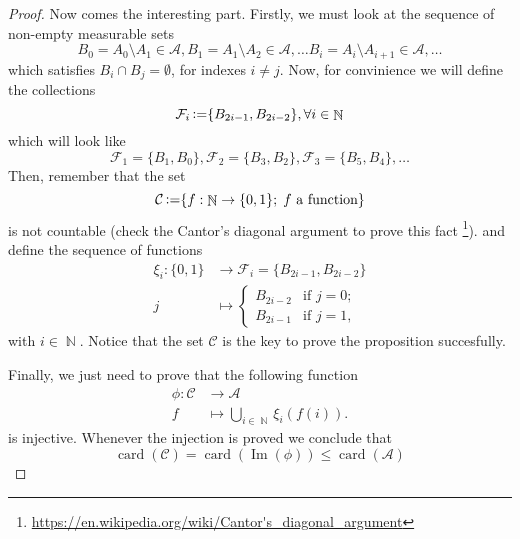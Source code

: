 \documentclass[11pt,twoside,a4paper]{article}
\DeclareMathOperator {\card}{card}
\DeclareMathOperator {\N}{\mathbb{N}}
\DeclareMathOperator{\definedAs}{\vcentcolon = }
\DeclareMathOperator {\Imagem}{ Im }
\theoremstyle{remark}
\theoremstyle{definition}
\theoremstyle{plain}
\begin{document}
\begin{proof}
    Now comes the interesting part. Firstly, we must look at the sequence
    of non-empty measurable sets
    \begin{equation*}
        B_0 = A_0 \setminus A_1 \in \mathcal{A},
        B_1 = A_1 \setminus A_2 \in \mathcal{A},
        \ldots
        B_i = A_i \setminus A_{i+1} \in \mathcal{A},
        \ldots
    \end{equation*}
    which satisfies $B_i \cap B_j  = \emptyset$, for indexes $i \neq j$.
    Now, for convinience we will define the collections
    \begin{equation*}
        \mathcal{F}_i \definedAs \{B_{2i -1},B_{2i -2} \}, \forall i \in \N
    \end{equation*}
    which will look like
    \begin{equation*}
        \mathcal{F}_1 = \{B_1, B_0\},
        \mathcal{F}_2 = \{B_3, B_2\},
        \mathcal{F}_3 = \{B_5, B_4\},
        \ldots
    \end{equation*}
    Then, remember that the set
    \begin{equation*}
        \mathcal{C} \definedAs \{f:\N \to \{0,1\}; \; f \text{ a function} \}
    \end{equation*}
    is not countable 
    (check the Cantor's diagonal argument to prove this fact
    \footnote{
        \url{https://en.wikipedia.org/wiki/Cantor's_diagonal_argument}
    }). 
    and define the sequence of functions
    \begin{align*}
        \xi_i: \{0,1\} & \to \mathcal{F}_i = \{B_{2i -1},B_{2i -2} \}\\
        j & \mapsto 
        \begin{cases}
        B_{2i -2} & \text{if } j = 0;\\
        B_{2i -1} & \text{if } j = 1,
        \end{cases}
    \end{align*}
    with $i \in \N$. Notice that the set $\mathcal{C}$ is the key to
    prove the proposition succesfully.

    Finally, we just need to prove that the following
    function 
    \begin{align*}
        \phi: \mathcal{C} & \to \mathcal{A} \\
        f & \mapsto \bigcup_{i \in \N} \xi_i(f(i)).
    \end{align*}
    is injective. Whenever the injection is proved we conclude
    that
    \begin{equation*}
        \card( \mathcal{C} ) = \card( \Imagem(\phi) ) \leq \card( \mathcal{A} )
    \end{equation*}


\end{proof}
\end{document}
